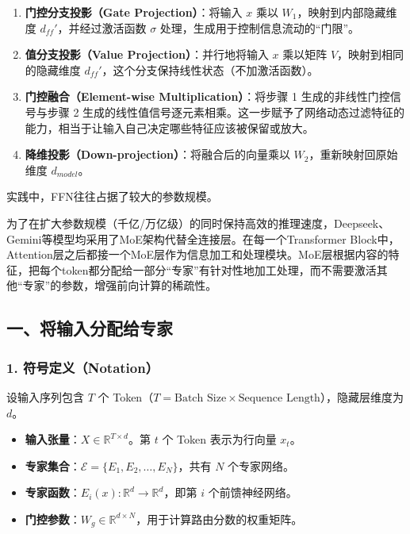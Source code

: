 \begin{enumerate}
\def\labelenumi{\arabic{enumi}.}
\tightlist
\item
  \textbf{门控分支投影（Gate Projection）}：将输入 \(x\) 乘以 \(W_1\)，映射到内部隐藏维度 \(d_{ff}'\)，并经过激活函数 \(\sigma\) 处理，生成用于控制信息流动的``门限''。
\item
  \textbf{值分支投影（Value Projection）}：并行地将输入 \(x\) 乘以矩阵 \(V\)，映射到相同的隐藏维度 \(d_{ff}'\)，这个分支保持线性状态（不加激活函数）。
\item
  \textbf{门控融合（Element-wise Multiplication）}：将步骤 1 生成的非线性门控信号与步骤 2 生成的线性值信号逐元素相乘。这一步赋予了网络动态过滤特征的能力，相当于让输入自己决定哪些特征应该被保留或放大。
\item
  \textbf{降维投影（Down-projection）}：将融合后的向量乘以 \(W_2\)，重新映射回原始维度 \(d_{model}\)。
\end{enumerate}

实践中，FFN往往占据了较大的参数规模。

为了在扩大参数规模（千亿/万亿级）的同时保持高效的推理速度，Deepseek、Gemini等模型均采用了MoE架构代替全连接层。在每一个Transformer Block中，Attention层之后都接一个MoE层作为信息加工和处理模块。MoE层根据内容的特征，把每个token都分配给一部分``专家''有针对性地加工处理，而不需要激活其他``专家''的参数，增强前向计算的稀疏性。

\hypertarget{ux4e00ux5c06ux8f93ux5165ux5206ux914dux7ed9ux4e13ux5bb6}{%
\subsection{一、将输入分配给专家}\label{ux4e00ux5c06ux8f93ux5165ux5206ux914dux7ed9ux4e13ux5bb6}}

\hypertarget{ux7b26ux53f7ux5b9aux4e49notation}{%
\subsubsection{1. 符号定义（Notation）}\label{ux7b26ux53f7ux5b9aux4e49notation}}

设输入序列包含 \(T\) 个 Token（\(T=\text{Batch Size} \times \text{Sequence Length}\)），隐藏层维度为 \(d\)。

\begin{itemize}
\tightlist
\item
  \textbf{输入张量}：\(X \in \mathbb{R}^{T \times d}\)。第 \(t\) 个 Token 表示为行向量 \(x_t\)。
\item
  \textbf{专家集合}：\(\mathcal{E}=\{E_1,E_2,\ldots,E_N\}\)，共有 \(N\) 个专家网络。
\item
  \textbf{专家函数}：\(E_i(x): \mathbb{R}^d \to \mathbb{R}^d\)，即第 \(i\) 个前馈神经网络。
\item
  \textbf{门控参数}：\(W_g \in \mathbb{R}^{d \times N}\)，用于计算路由分数的权重矩阵。
\end{itemize}

